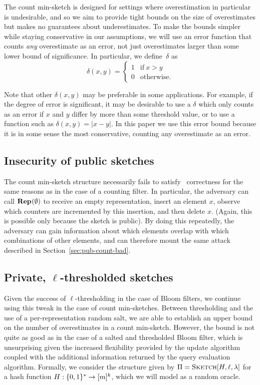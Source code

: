 %
The count min-sketch is designed for settings where overestimation in particular
is undesirable, and so we aim to provide tight bounds on the size of
overestimates but makes no guarantees about underestimates. To make the bounds
simpler while staying conservative in our assumptions, we will use an error
function that counts \emph{any} overestimate as an error, not just overestimates
larger than some lower bound of significance. In particular, we define~$\delta$
as
%
\begin{equation}
  \delta(x, y) =
  \begin{cases}
    1 & \text{if}\ x > y \\
    0 & \text{otherwise.}
  \end{cases}
\end{equation}

Note that other $\delta(x,y)$ may be preferable in some applications. For
example, if the degree of error is significant, it may be desirable to use a $\delta$
which only counts as an error if $x$ and $y$ differ by more than some threshold value,
or to use a function such as $\delta(x,y) = |x-y|$. In this paper we use this
error bound because it is in some sense the most conservative, counting any
overestimate as an error.

\subsection{Insecurity of public sketches}

The count min-sketch structure necessarily fails to satisfy \errep\
correctness for the same reasons as in the case of a counting filter. In
particular, the adversary can call $\textup{\textbf{Rep}}\hspace{0.5pt}(\emptyset)$ to receive an empty
representation, insert an element $x$, observe which counters are incremented by
this insertion, and then delete $x$. (Again, this is possible only because the
sketch is public). By doing this repeatedly, the adversary can
gain information about which elements overlap with which combinations of other
elements, and can therefore mount the same attack described in
Section~\ref{sec:pub-count-bad}.

\subsection{Private, $\ell$-thresholded sketches}

Given the success of $\ell$-thresholding in the case of Bloom filters, we
continue using this tweak in the case of count min-sketches. Between
thresholding and the use of a per-representation random salt, we are able to
establish an upper bound on the number of overestimates in a count min-sketch.
However, the bound is not quite as good as in the case of a salted and
thresholded Bloom filter, which is unsurprising given the increased flexibility
provided by the update algorithm coupled with the additional
information returned by the query evaluation algorithm.
%
Formally, we consider the structure given by $\Pi = \textnormal{\textsc{Sketch}}[H,\ell,\lambda]$ for
a hash function $H: \{0,1\}^* \to [m]^k$, which we will model as a random oracle.

